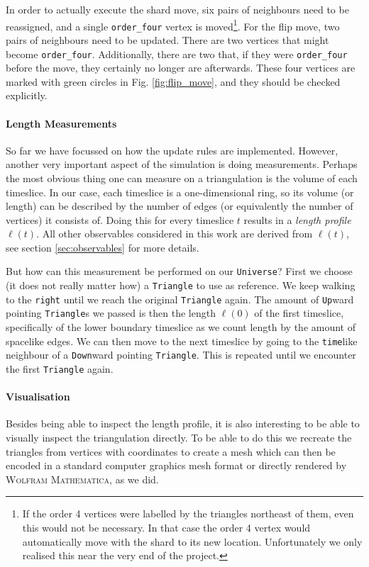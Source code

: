 In order to actually execute the shard move, six pairs of neighbours need to be reassigned, and a single \verb|order_four| vertex is moved\footnote{If the order 4 vertices were labelled by the triangles northeast of them, even this would not be necessary. In that case the order 4 vertex would automatically move with the shard to its new location. Unfortunately we only realised this near the very end of the project.}. For the flip move, two pairs of neighbours need to be updated. There are two vertices that might become \verb|order_four|. Additionally, there are two that, if they were \verb|order_four| before the move, they certainly no longer are afterwards. These four vertices are marked with green circles in Fig. \ref{fig:flip_move}, and they should be checked explicitly.

\paragraph{Length Measurements}
So far we have focussed on how the update rules are implemented. However, another very important aspect of the simulation is doing measurements. Perhaps the most obvious thing one can measure on a triangulation is the volume of each timeslice. In our case, each timeslice is a one-dimensional ring, so its volume (or length) can be described by the number of edges (or equivalently the number of vertices) it consists of. Doing this for every timeslice $t$ results in a \emph{length profile} $\ell(t)$. All other observables considered in this work are derived from $\ell(t)$, see section \ref{sec:observables} for more details.

But how can this measurement be performed on our \verb|Universe|? First we choose (it does not really matter how) a \verb|Triangle| to use as reference. We keep walking to the \verb|right| until we reach the original \verb|Triangle| again. The amount of \verb|Up|ward pointing \verb|Triangle|s we passed is then the length $\ell(0)$ of the first timeslice, specifically of the lower boundary timeslice as we count length by the amount of spacelike edges. We can then move to the next timeslice by going to the \verb|time|like neighbour of a \verb|Down|ward pointing \verb|Triangle|. This is repeated until we encounter the first \verb|Triangle| again.

\paragraph{Visualisation}
Besides being able to inspect the length profile, it is also interesting to be able to visually inspect the triangulation directly.
To be able to do this we recreate the triangles from vertices with coordinates to create a mesh which can then be encoded in a standard computer graphics mesh format or directly rendered by \textsc{Wolfram Mathematica}, as we did.

